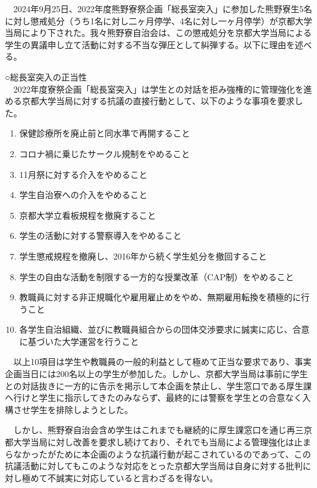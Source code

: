 {\small
\begin{tcolorbox}[colback=white, colbacktitle=gray!30!white, coltitle=black, title=2024年9月25日付で京大生5名に下された懲戒処分に対する抗議声明,breakable]

　2024年9月25日、2022年度熊野寮祭企画「総長室突入」に参加した熊野寮生5名に対し懲戒処分（うち1名に対し二ヶ月停学、4名に対し一ヶ月停学）が京都大学当局により下された。我々熊野寮自治会は、この懲戒処分を京都大学当局による学生の異議申し立て活動に対する不当な弾圧として糾弾する。以下に理由を述べる。

\noindent ○総長室突入の正当性\\
　2022年度寮祭企画「総長室突入」は学生との対話を拒み強権的に管理強化を進める京都大学当局に対する抗議の直接行動として、以下のような事項を要求した。
    
    \begin{enumerate}
        \item 保健診療所を廃止前と同水準で再開すること
        \item コロナ禍に乗じたサークル規制をやめること
        \item 11月祭に対する介入をやめること
        \item 学生自治寮への介入をやめること
        \item 京都大学立看板規程を撤廃すること
        \item 学生の活動に対する警察導入をやめること
        \item 学生懲戒規程を撤廃し、2016年から続く学生処分を撤回すること
        \item 学生の自由な活動を制限する一方的な授業改革（CAP制）をやめること
        \item 教職員に対する非正規職化や雇用雇止めをやめ、無期雇用転換を積極的に行うこと
        \item 各学生自治組織、並びに教職員組合からの団体交渉要求に誠実に応じ、合意に基づいた大学運営を行うこと
    \end{enumerate}
    
　以上10項目は学生や教職員の一般的利益として極めて正当な要求であり、事実企画当日には200名以上の学生が参加した。しかし、京都大学当局は事前に学生との対話抜きに一方的に告示を掲示して本企画を禁止し、学生窓口である厚生課へ行けと学生に指示してきたのみならず、最終的には警察を学生との合意なく入構させ学生を排除しようとした。

　しかし、熊野寮自治会含め学生はこれまでも継続的に厚生課窓口を通じ再三京都大学当局に対し改善を要求し続けており、それでも当局による管理強化は止まらなかったがために本企画のような抗議行動が起こされているのであって、この抗議活動に対してもこのような対応をとった京都大学当局は自身に対する批判に対し極めて不誠実に対応していると言わざるを得ない。


\end{tcolorbox}}

